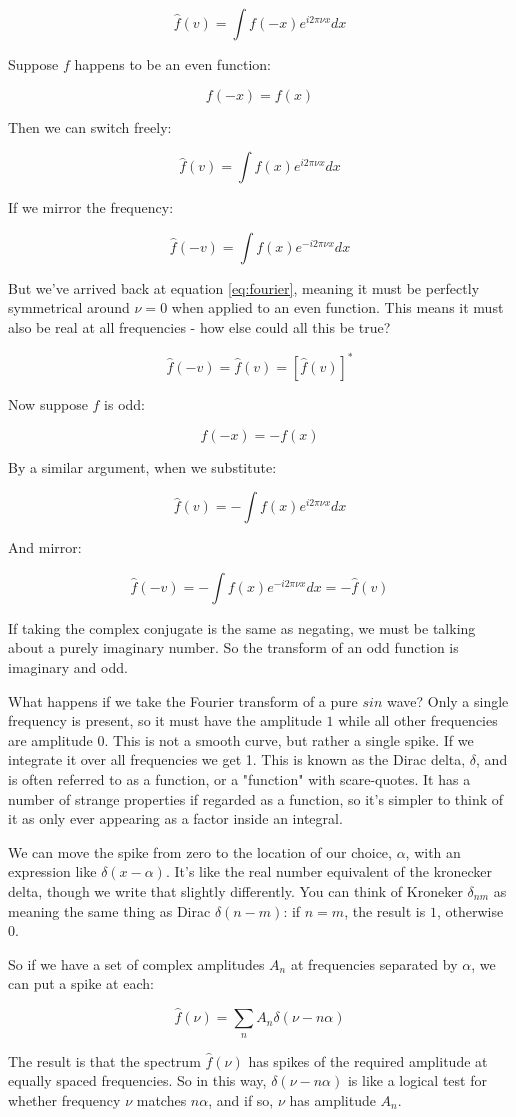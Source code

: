 $$\hat{f}(v) = \int f(-x)e^{i2\pi\nu x} dx$$

Suppose $f$ happens to be an even function:

$$f(-x) = f(x)$$

Then we can switch freely:

$$\hat{f}(v) = \int f(x)e^{i2\pi\nu x} dx$$

If we mirror the frequency:

$$\hat{f}(-v) = \int f(x)e^{-i2\pi\nu x} dx$$

But we've arrived back at equation \ref{eq:fourier}, meaning it must be perfectly symmetrical around $\nu = 0$ when applied to an even function. This means it must also be real at all frequencies - how else could all this be true?

$$
\hat{f}(-v) = \hat{f}(v) = \left[ \hat{f}(v) \right]^*
$$

Now suppose $f$ is odd:

$$f(-x) = -f(x)$$

By a similar argument, when we substitute:

$$
\hat{f}(v) = - \int f(x)e^{i2\pi\nu x}
dx
$$

And mirror:

$$
\hat{f}(-v) = - \int f(x)e^{-i2\pi\nu x}
dx
= -\hat{f}(v)
$$

If taking the complex conjugate is the same as negating, we must be talking about a purely imaginary number. So the transform of an odd function is imaginary and odd.

What happens if we take the Fourier transform of a pure $sin$ wave? Only a single frequency is present, so it must have the amplitude $1$ while all other frequencies are amplitude $0$. This is not a smooth curve, but rather a single spike. If we integrate it over all frequencies we get 1. This is known as the Dirac delta, $\delta$, and is often referred to as a function, or a "function" with scare-quotes. It has a number of strange properties if regarded as a function, so it's simpler to think of it as only ever appearing as a factor inside an integral.

We can move the spike from zero to the location of our choice, $\alpha$, with an expression like $\delta(x - \alpha)$. It's like the real number equivalent of the kronecker delta, though we write that slightly differently. You can think of Kroneker $\delta_{nm}$ as meaning the same thing as Dirac $\delta(n - m)$: if $n = m$, the result is $1$, otherwise $0$.

So if we have a set of complex amplitudes $A_n$ at frequencies separated by $\alpha$, we can put a spike at each:

$$
\hat{f}(\nu) =
\sum_n A_n \delta(\nu - n\alpha)
$$

The result is that the spectrum $\hat{f}(\nu)$ has spikes of the required amplitude at equally spaced frequencies. So in this way, $\delta(\nu - n\alpha)$ is like a logical test for whether frequency $\nu$ matches $n\alpha$, and if so, $\nu$ has amplitude $A_n$.
